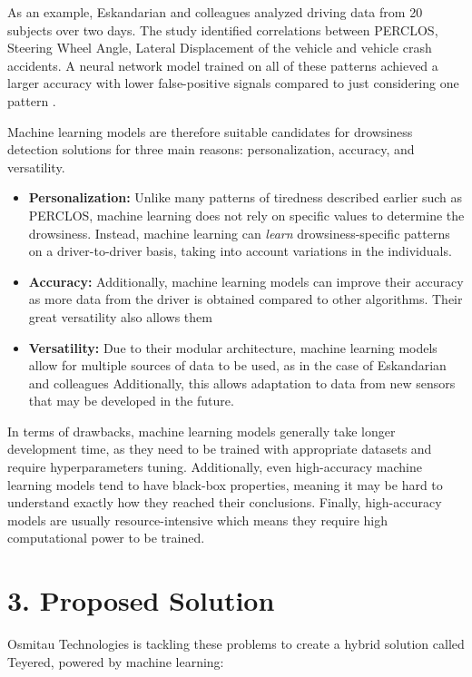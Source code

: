 \documentclass[a4paper]{article}
\begin{document}
As an example, Eskandarian and colleagues analyzed driving data from 20
subjects over two days. The study identified correlations between
PERCLOS, Steering Wheel Angle, Lateral Displacement of the vehicle and
vehicle crash accidents. A neural network model trained on all of these
patterns achieved a larger accuracy with lower false-positive signals
compared to just considering one pattern \cite{eskandarian_evaluation_2007}.

Machine learning models are therefore suitable candidates for drowsiness
detection solutions for three main reasons: personalization, accuracy,
and versatility.

\begin{itemize}
\item
  \textbf{Personalization:} Unlike many patterns of tiredness described
  earlier such as PERCLOS, machine learning does not rely on specific
  values to determine the drowsiness. Instead, machine learning can
  \emph{learn} drowsiness-specific patterns on a driver-to-driver basis,
  taking into account variations in the individuals.
\item
  \textbf{Accuracy:} Additionally, machine learning models can improve
  their accuracy as more data from the driver is obtained compared to
  other algorithms. Their great versatility also allows them
\item
  \textbf{Versatility:} Due to their modular architecture, machine
  learning models allow for multiple sources of data to be used, as in
  the case of Eskandarian and colleagues Additionally, this allows
  adaptation to data from new sensors that may be developed in the
  future.
\end{itemize}

In terms of drawbacks, machine learning models generally take longer
development time, as they need to be trained with appropriate datasets
and require hyperparameters tuning. Additionally, even high-accuracy
machine learning models tend to have black-box properties, meaning it
may be hard to understand exactly how they reached their conclusions.
Finally, high-accuracy models are usually resource-intensive which means
they require high computational power to be trained.

\hypertarget{proposed-solution}{%
\section{3. Proposed Solution}\label{proposed-solution}}

Osmitau Technologies is tackling these problems to create a hybrid
solution called Teyered, powered by machine learning:
\end{document}
